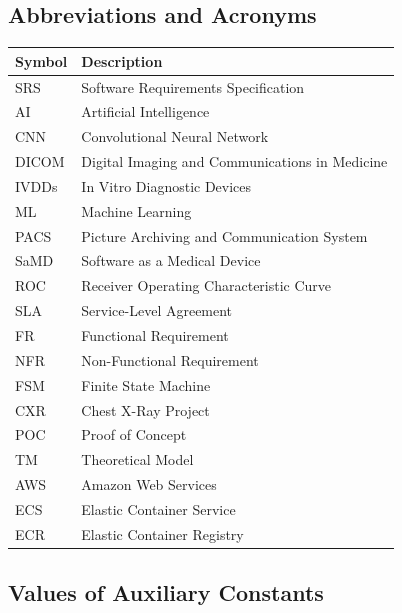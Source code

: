 \documentclass[12pt]{article}
\begin{document}
\subsection{Abbreviations and Acronyms}
\renewcommand{\arraystretch}{1.3}
\noindent \begin{tabular}{l l} 
  \toprule		
  \textbf{Symbol} & \textbf{Description}\\
  \midrule 
  SRS & Software Requirements Specification\\
  AI & Artificial Intelligence\\
  CNN & Convolutional Neural Network\\
  DICOM & Digital Imaging and Communications in Medicine\\
  IVDDs & In Vitro Diagnostic Devices\\
  ML & Machine Learning\\
  PACS & Picture Archiving and Communication System\\
  SaMD & Software as a Medical Device\\
  ROC & Receiver Operating Characteristic Curve\\
  SLA & Service-Level Agreement\\
  FR & Functional Requirement\\
  NFR & Non-Functional Requirement\\
  FSM & Finite State Machine\\
  CXR & Chest X-Ray Project\\
  POC & Proof of Concept\\
  TM & Theoretical Model\\
  AWS & Amazon Web Services\\
  ECS & Elastic Container Service\\
  ECR & Elastic Container Registry\\
  \bottomrule
\end{tabular}
\newpage
\subsection{Values of Auxiliary Constants}
\end{document}
